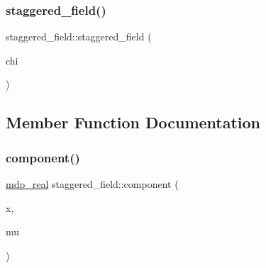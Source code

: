 \mbox{\label{classstaggered__field_a22b5b7f7d050f6356451df02356f181d}} 
\subsubsection{\texorpdfstring{staggered\+\_\+field()}{staggered\_field()}\hspace{0.1cm}{\footnotesize\ttfamily [2/2]}}
{\footnotesize\ttfamily staggered\+\_\+field\+::staggered\+\_\+field (\begin{DoxyParamCaption}\item[{const \hyperlink{classstaggered__field}{staggered\+\_\+field} \&}]{chi }\end{DoxyParamCaption})\hspace{0.3cm}{\ttfamily [inline]}}



\subsection{Member Function Documentation}
\mbox{\label{classstaggered__field_a613e227e2cc092c103ce431000fd4b53}} 
\subsubsection{\texorpdfstring{component()}{component()}}
{\footnotesize\ttfamily \hyperlink{mdp__global__vars_8h_a69d96b74c791e0bbdb888b3913a69450}{mdp\+\_\+real} staggered\+\_\+field\+::component (\begin{DoxyParamCaption}\item[{\hyperlink{mdp__compatibility__macros_8h_aa6f1179c424e48adef1cedf7c436eb75}{site}}]{x,  }\item[{int}]{mu }\end{DoxyParamCaption})\hspace{0.3cm}{\ttfamily [inline]}}

\mbox{\label{classstaggered__field_ae89b67366b3566c3c8a89d3303dc1d62}} 
